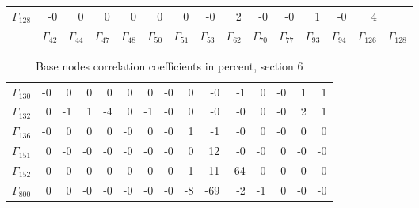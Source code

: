 {\begin{table}
\begin{center}
\begin{minipage}{\linewidth}
\begin{center}
\begin{envsmall}
\begin{center}
\begin{tabular}{rrrrrrrrrrrrrrr}
\( \Gamma_{128} \) &   -0 &    0 &    0 &    0 &    0 &    0 &   -0 &    2 &   -0 &   -0 &    1 &   -0 &    4 &  \\
 & \( \Gamma_{42} \) & \( \Gamma_{44} \) & \( \Gamma_{47} \) & \( \Gamma_{48} \) & \( \Gamma_{50} \) & \( \Gamma_{51} \) & \( \Gamma_{53} \) & \( \Gamma_{62} \) & \( \Gamma_{70} \) & \( \Gamma_{77} \) & \( \Gamma_{93} \) & \( \Gamma_{94} \) & \( \Gamma_{126} \) & \( \Gamma_{128} \)
\\\hline
\end{tabular}
\end{center}
\end{envsmall}
\ifhevea\else
\end{center}
\end{minipage}
\fi
\end{center}
\ifhevea\end{table}\fi
\ifhevea\begin{table}\fi%
\begin{center}
\ifhevea
\caption{Base nodes correlation coefficients in percent, section 6\label{tab:tau:br-fit-corr6}}%
\else
\begin{minipage}{\linewidth}
\begin{center}
\label{tab:tau:br-fit-corr6}%
\fi
\begin{envsmall}
\begin{center}
\renewcommand*{\arraystretch}{1.1}%
\begin{tabular}{rrrrrrrrrrrrrrr}
\hline
\( \Gamma_{130} \) &   -0 &    0 &    0 &    0 &    0 &    0 &   -0 &    0 &   -0 &   -1 &    0 &   -0 &    1 &    1 \\
\( \Gamma_{132} \) &    0 &   -1 &    1 &   -4 &    0 &   -1 &   -0 &    0 &   -0 &   -0 &    0 &   -0 &    2 &    1 \\
\( \Gamma_{136} \) &   -0 &    0 &    0 &    0 &   -0 &    0 &   -0 &    1 &   -1 &   -0 &    0 &   -0 &    0 &    0 \\
\( \Gamma_{151} \) &    0 &   -0 &   -0 &   -0 &   -0 &   -0 &   -0 &    0 &   12 &   -0 &   -0 &    0 &   -0 &   -0 \\
\( \Gamma_{152} \) &    0 &   -0 &    0 &    0 &    0 &    0 &    0 &   -1 &  -11 &  -64 &   -0 &   -0 &   -0 &   -0 \\
\( \Gamma_{800} \) &    0 &    0 &   -0 &   -0 &   -0 &   -0 &   -0 &   -8 &  -69 &   -2 &   -1 &    0 &   -0 &   -0 \\

\end{tabular}
\end{center}
\end{envsmall}
\end{center}
\end{minipage}
\end{center}
\end{table}}

